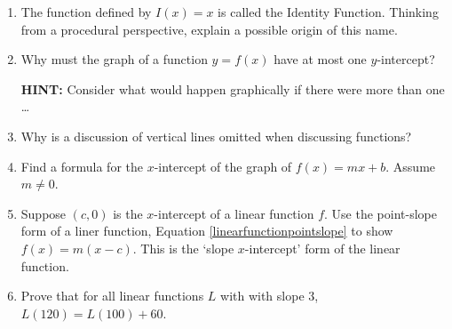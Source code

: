 \documentclass{ximera}
\begin{document}
\begin{enumerate}
\begin{center}
\end{center}

\setcounter{HW}{\value{enumi}}
\end{enumerate}


\begin{enumerate}
\setcounter{enumi}{\value{HW}}

\item \label{identityexercise} The function defined by $I(x) = x$ is called the  Identity Function.   Thinking from a procedural perspective, explain a possible origin of this name.

\item  \label{onlyoneyintexercise} Why must the graph of a function $y = f(x)$ have at most one $y$-intercept?

\textbf{HINT:}  Consider what would happen graphically if there were more than one \ldots

\item  Why is a discussion of vertical lines omitted when discussing functions?

\item  \label{xinterceptoflinear} Find a formula for the $x$-intercept of the graph of $f(x) = mx + b$.  Assume $m \neq 0$.

\item  \label{xinterceptformoflinear} Suppose $(c,0)$ is the $x$-intercept of a linear function $f$.  Use the point-slope form of a liner function, Equation \ref{linearfunctionpointslope} to show $f(x) = m(x-c)$.  This is the `slope $x$-intercept' form of the linear function.

\item Prove that for all linear functions $L$ with with slope $3$, $L(120) = L(100) + 60$.

\setcounter{HW}{\value{enumi}}
\end{enumerate}
\end{document}
